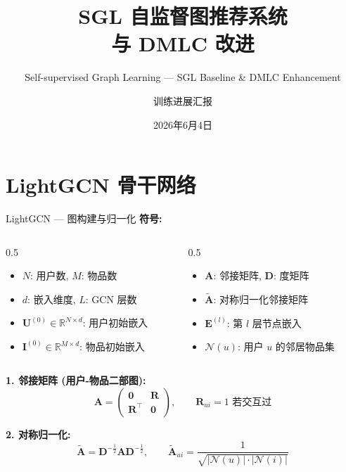 \documentclass[9pt, aspectratio=169]{ctexbeamer}
\title{SGL 自监督图推荐系统\\与 DMLC 改进}
\subtitle{Self-supervised Graph Learning --- SGL Baseline \& DMLC Enhancement}
\author{训练进展汇报}
\date{2026年6月4日}
\begin{document}
\frame{\titlepage}

\section{LightGCN 骨干网络}
\begin{frame}{LightGCN --- 图构建与归一化}
  \textbf{符号:}
  \begin{columns}[t]
    \begin{column}{0.5\textwidth}\footnotesize
      \begin{itemize}
        \item $N$: 用户数, $M$: 物品数
        \item $d$: 嵌入维度, $L$: GCN 层数
        \item $\mathbf{U}^{(0)}\in\mathbb{R}^{N\times d}$: 用户初始嵌入
        \item $\mathbf{I}^{(0)}\in\mathbb{R}^{M\times d}$: 物品初始嵌入
      \end{itemize}
    \end{column}
    \begin{column}{0.5\textwidth}\footnotesize
      \begin{itemize}
        \item $\mathbf{A}$: 邻接矩阵, $\mathbf{D}$: 度矩阵
        \item $\tilde{\mathbf{A}}$: 对称归一化邻接矩阵
        \item $\mathbf{E}^{(l)}$: 第 $l$ 层节点嵌入
        \item $\mathcal{N}(u)$: 用户 $u$ 的邻居物品集
      \end{itemize}
    \end{column}
  \end{columns}

  \vspace{0.3em}
  \textbf{1. 邻接矩阵 (用户-物品二部图):}
  \begin{equation*}
    \mathbf{A} = \begin{pmatrix}\mathbf{0} & \mathbf{R} \\ \mathbf{R}^\top & \mathbf{0}\end{pmatrix},\qquad
    \mathbf{R}_{ui}=1 \text{ 若交互过}
  \end{equation*}

  \textbf{2. 对称归一化:}
  \begin{equation*}
    \tilde{\mathbf{A}} = \mathbf{D}^{-\frac12}\mathbf{A}\mathbf{D}^{-\frac12},\qquad
    \tilde{\mathbf{A}}_{ui} = \frac{1}{\sqrt{|\mathcal{N}(u)|\cdot|\mathcal{N}(i)|}}
  \end{equation*}
\end{frame}
\end{document}
